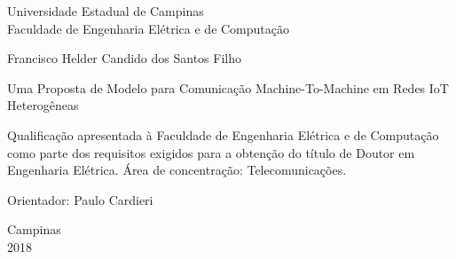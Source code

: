 
\begin{center}
\large Universidade Estadual de Campinas\\
Faculdade de Engenharia Elétrica e de Computação
\end{center}

\vspace*{1.5cm}
\begin{center}
\large Francisco Helder Candido dos Santos Filho
\end{center}


\vspace*{2.3cm}

\begin{center}
{\sc  Uma Proposta de Modelo para Comunicação Machine-To-Machine em Redes IoT Heterogêneas}
\end{center}

\vspace*{3.0cm}

\begin{flushright}
\begin{minipage}{9.0cm}
Qualificação apresentada à Faculdade de Engenharia Elétrica e de Computação como  parte dos requisitos exigidos para a obtenção do título de Doutor em Engenharia Elétrica. Área de concentração: Telecomunicações. 

\vspace*{0.5cm}
Orientador: Paulo Cardieri

\end{minipage}
\end{flushright}

\null \vfill

\vspace*{0.5cm}

\begin{center}
Campinas\\2018
\end{center}